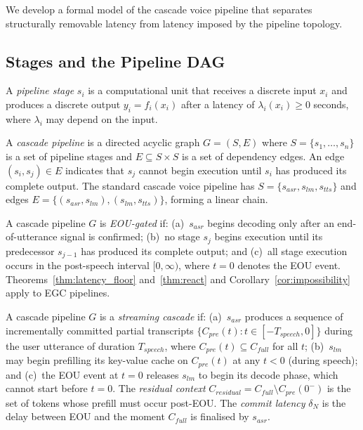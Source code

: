 We develop a formal model of the cascade voice pipeline that separates
structurally removable latency from latency imposed by the pipeline topology.

\subsection{Stages and the Pipeline DAG}

\begin{definition}
A \emph{pipeline stage} $s_i$ is a computational unit that receives a discrete input
$x_i$ and produces a discrete output $y_i = f_i(x_i)$ after a latency of
$\lambda_i(x_i) \geq 0$ seconds, where $\lambda_i$ may depend on the input.
\end{definition}

\begin{definition}
\label{def:cascade_dag}
A \emph{cascade pipeline} is a directed acyclic graph $G = (S, E)$ where
$S = \{s_1, \ldots, s_n\}$ is a set of pipeline stages and
$E \subseteq S \times S$ is a set of dependency edges.
An edge $(s_i, s_j) \in E$ indicates that $s_j$ cannot begin execution until $s_i$
has produced its complete output.
The standard cascade voice pipeline has $S = \{s_{asr}, s_{lm}, s_{tts}\}$ and
edges $E = \{(s_{asr}, s_{lm}), (s_{lm}, s_{tts})\}$, forming a linear chain.
\end{definition}

\begin{definition}
\label{def:egc}
A cascade pipeline $G$ is \emph{EOU-gated} if:
(a)~$s_{asr}$ begins decoding only after an end-of-utterance signal is confirmed;
(b)~no stage $s_j$ begins execution until its predecessor $s_{j-1}$ has produced its
complete output; and
(c)~all stage execution occurs in the post-speech interval $[0, \infty)$,
where $t = 0$ denotes the EOU event.
Theorems~\ref{thm:latency_floor} and~\ref{thm:react} and
Corollary~\ref{cor:impossibility} apply to EGC pipelines.
\end{definition}

\begin{definition}
\label{def:sc}
A cascade pipeline $G$ is a \emph{streaming cascade} if:
(a)~$s_{asr}$ produces a sequence of incrementally committed partial transcripts
$\{C_{pre}(t) : t \in [-T_{speech}, 0]\}$ during the user utterance of duration
$T_{speech}$, where $C_{pre}(t) \subseteq C_{full}$ for all $t$;
(b)~$s_{lm}$ may begin prefilling its key-value cache on $C_{pre}(t)$ at any
$t < 0$ (during speech); and
(c)~the EOU event at $t = 0$ releases $s_{lm}$ to begin its decode phase, which
cannot start before $t = 0$.
The \emph{residual context} $C_{residual} = C_{full} \setminus C_{pre}(0^-)$
is the set of tokens whose prefill must occur post-EOU.
The \emph{commit latency} $\delta_N$ is the delay between EOU and the moment
$C_{full}$ is finalised by $s_{asr}$.
\end{definition}

